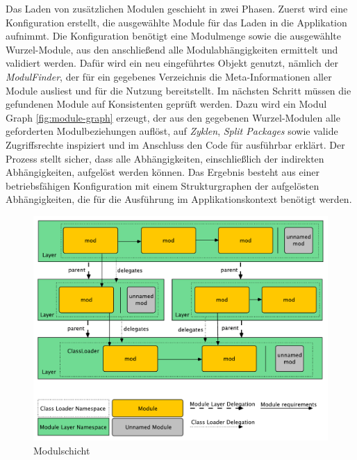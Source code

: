      Das Laden von zusätzlichen Modulen geschieht in zwei Phasen. Zuerst wird eine Konfiguration erstellt, die ausgewählte Module für das Laden in die Applikation aufnimmt. Die Konfiguration benötigt eine Modulmenge sowie die ausgewählte Wurzel-Module, aus den anschließend alle Modulabhängigkeiten ermittelt und validiert werden. Dafür wird ein neu eingeführtes Objekt genutzt, nämlich der \textit{ModulFinder}, der für ein gegebenes Verzeichnis die Meta-Informationen aller Module ausliest und für die Nutzung bereitstellt. \newline
     Im nächsten Schritt müssen die gefundenen Module auf Konsistenten geprüft werden. Dazu wird ein Modul Graph \ref{fig:module-graph} erzeugt, der aus den gegebenen Wurzel-Modulen alle geforderten Modulbeziehungen auflöst, auf \textit{Zyklen}, \textit{Split Packages} sowie valide Zugriffsrechte inspiziert und im Anschluss den Code für ausführbar erklärt. Der Prozess stellt sicher, dass alle Abhängigkeiten, einschließlich der indirekten Abhängigkeiten, aufgelöst werden können.\newline
     Das Ergebnis besteht aus einer betriebsfähigen Konfiguration mit einem Strukturgraphen der aufgelösten Abhängigkeiten, die für die Ausführung im Applikationskontext benötigt werden. \cite{java9modRevealed}\bigbreak 

    \begin{figure}[h!]
      \centering
      \includegraphics[width=\textwidth]{material/images/module-layer.pdf}
      \caption{Modulschicht \cite{javaMod9}}
      \label{fig:module-layer}
    \end{figure}

